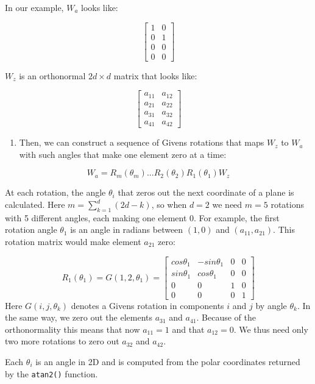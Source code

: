 In our example, \(W_a\) looks like:

\[ \begin{bmatrix}1 & 0 \\0  &1 \\ 0&0 \\0&0\end{bmatrix} \]

\(W_z\) is an orthonormal \(2d\times d\) matrix that looks like:

\[ \begin{bmatrix} a_{11} & a_{12} \\a_{21}  &a_{22} \\ a_{31}&a_{32} \\a_{41}&a_{42}\end{bmatrix} \]

\begin{enumerate}
\def\labelenumi{\arabic{enumi}.}
\setcounter{enumi}{2}
\tightlist
\item
  Then, we can construct a sequence of Givens rotations that maps \(W_z\) to \(W_a\) with such angles that make one element zero at a time:
\end{enumerate}

\[ W_a = R_m(\theta_m) ... R_2(\theta_2)R_1(\theta_1)W_z\]

At each rotation, the angle \(\theta_i\) that zeros out the next coordinate of a plane is calculated. Here \(m = \sum_{k=1}^d (2d - k)\), so when \(d=2\) we need \(m=5\) rotations with 5 different angles, each making one element 0. For example, the first rotation angle \(\theta_1\) is an angle in radians between \((1, 0)\) and \((a_{11}, a_{21})\). This rotation matrix would make element \(a_{21}\) zero:

\[R_1(\theta_1) = G(1, 2, \theta_1) = \begin{bmatrix} cos\theta_1 & -sin\theta_1 & 0 & 0 \\sin\theta_1  &cos\theta_1 & 0 &0 \\ 0&0&1&0 \\0&0&0&1\end{bmatrix}\]
Here \(G(i,j,\theta_k)\) denotes a Givens rotation in components \(i\) and \(j\) by angle \(\theta_k\).
In the same way, we zero out the elements \(a_{31}\) and \(a_{41}\). Because of the orthonormality this means that now \(a_{11} = 1\) and that \(a_{12} = 0\). We thus need only two more rotations to zero out \(a_{32}\) and \(a_{42}\).

Each \(\theta_i\) is an angle in 2D and is computed from the polar coordinates returned by the \texttt{atan2()} function.

